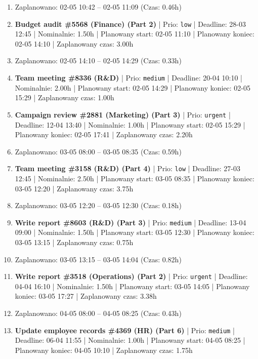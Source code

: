 {\begin{enumerate}
  \item [\textbf{PRZERWA}] Zaplanowano: 02-05 10:42 -- 02-05 11:09 (Czas: 0.46h)
  \item [\textbf{14693}] \textbf{Budget audit \#5568 (Finance) (Part 2)} | Prio: \texttt{low} | Deadline: 28-03 12:45 | Nominalnie: 1.50h | Planowany start: 02-05 11:10 | Planowany koniec: 02-05 14:10 | Zaplanowany czas: 3.00h
  \item [\textbf{PRZERWA}] Zaplanowano: 02-05 14:10 -- 02-05 14:29 (Czas: 0.33h)
  \item [\textbf{14649}] \textbf{Team meeting \#8336 (R\&D)} | Prio: \texttt{medium} | Deadline: 20-04 10:10 | Nominalnie: 2.00h | Planowany start: 02-05 14:29 | Planowany koniec: 02-05 15:29 | Zaplanowany czas: 1.00h
  \item [\textbf{14599}] \textbf{Campaign review \#2881 (Marketing) (Part 3)} | Prio: \texttt{urgent} | Deadline: 12-04 13:40 | Nominalnie: 1.00h | Planowany start: 02-05 15:29 | Planowany koniec: 02-05 17:41 | Zaplanowany czas: 2.20h
  \item [\textbf{PRZERWA}] Zaplanowano: 03-05 08:00 -- 03-05 08:35 (Czas: 0.59h)
  \item [\textbf{14688}] \textbf{Team meeting \#3158 (R\&D) (Part 4)} | Prio: \texttt{low} | Deadline: 27-03 12:45 | Nominalnie: 2.50h | Planowany start: 03-05 08:35 | Planowany koniec: 03-05 12:20 | Zaplanowany czas: 3.75h
  \item [\textbf{PRZERWA}] Zaplanowano: 03-05 12:20 -- 03-05 12:30 (Czas: 0.18h)
  \item [\textbf{14634}] \textbf{Write report \#8603 (R\&D) (Part 3)} | Prio: \texttt{medium} | Deadline: 13-04 09:00 | Nominalnie: 1.50h | Planowany start: 03-05 12:30 | Planowany koniec: 03-05 13:15 | Zaplanowany czas: 0.75h
  \item [\textbf{PRZERWA}] Zaplanowano: 03-05 13:15 -- 03-05 14:04 (Czas: 0.82h)
  \item [\textbf{14598}] \textbf{Write report \#3518 (Operations) (Part 2)} | Prio: \texttt{urgent} | Deadline: 04-04 16:10 | Nominalnie: 1.50h | Planowany start: 03-05 14:05 | Planowany koniec: 03-05 17:27 | Zaplanowany czas: 3.38h
  \item [\textbf{PRZERWA}] Zaplanowano: 04-05 08:00 -- 04-05 08:25 (Czas: 0.43h)
  \item [\textbf{14658}] \textbf{Update employee records \#4369 (HR) (Part 6)} | Prio: \texttt{medium} | Deadline: 06-04 11:55 | Nominalnie: 1.00h | Planowany start: 04-05 08:25 | Planowany koniec: 04-05 10:10 | Zaplanowany czas: 1.75h

\end{enumerate}}
